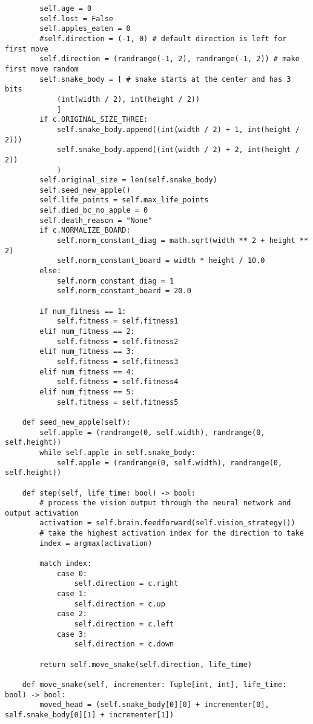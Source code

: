 \documentclass[11pt,a4paper]{article}
\begin{document}
\begin{verbatim}
        self.age = 0
        self.lost = False
        self.apples_eaten = 0
        #self.direction = (-1, 0) # default direction is left for first move
        self.direction = (randrange(-1, 2), randrange(-1, 2)) # make first move random
        self.snake_body = [ # snake starts at the center and has 3 bits
            (int(width / 2), int(height / 2))
            ]
        if c.ORIGINAL_SIZE_THREE:
            self.snake_body.append((int(width / 2) + 1, int(height / 2)))
            self.snake_body.append((int(width / 2) + 2, int(height / 2))
            )
        self.original_size = len(self.snake_body)
        self.seed_new_apple()
        self.life_points = self.max_life_points
        self.died_bc_no_apple = 0
        self.death_reason = "None"
        if c.NORMALIZE_BOARD:
            self.norm_constant_diag = math.sqrt(width ** 2 + height ** 2)
            self.norm_constant_board = width * height / 10.0
        else:
            self.norm_constant_diag = 1
            self.norm_constant_board = 20.0

        if num_fitness == 1:
            self.fitness = self.fitness1
        elif num_fitness == 2:
            self.fitness = self.fitness2
        elif num_fitness == 3:
            self.fitness = self.fitness3
        elif num_fitness == 4:
            self.fitness = self.fitness4
        elif num_fitness == 5:
            self.fitness = self.fitness5

    def seed_new_apple(self):
        self.apple = (randrange(0, self.width), randrange(0, self.height))
        while self.apple in self.snake_body:
            self.apple = (randrange(0, self.width), randrange(0, self.height))

    def step(self, life_time: bool) -> bool:
        # process the vision output through the neural network and output activation
        activation = self.brain.feedforward(self.vision_strategy())
        # take the highest activation index for the direction to take
        index = argmax(activation)

        match index:
            case 0:
                self.direction = c.right
            case 1:
                self.direction = c.up
            case 2:
                self.direction = c.left
            case 3:
                self.direction = c.down

        return self.move_snake(self.direction, life_time)

    def move_snake(self, incrementer: Tuple[int, int], life_time: bool) -> bool:
        moved_head = (self.snake_body[0][0] + incrementer[0], self.snake_body[0][1] + incrementer[1])


\end{verbatim}
\end{document}
